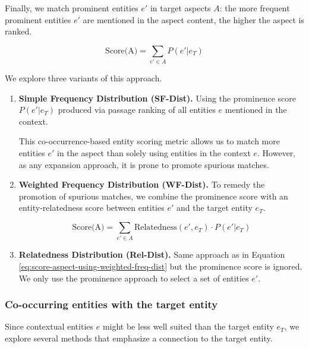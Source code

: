 Finally, we match prominent entities $e'$ in target aspects $A$: the more frequent  prominent entities $e'$ are mentioned in the aspect content, the higher the aspect is ranked. 

    \begin{equation}
    \label{eq:score-aspect-using-simple-freq-dist}
        \text{Score(A)} = \sum_{e' \in A}P(e' \vert e_T)
    \end{equation}



We explore three variants of this approach.

\begin{enumerate}
     \item \textbf{Simple Frequency Distribution (SF-Dist).}
     Using the prominence score $P(e' \vert e_T)$ produced via passage ranking of all entities $e$ mentioned in the context.

This co-occurrence-based entity scoring metric allows us to match more entities $e'$ in the aspect than solely using entities in the context $e$. However, as any expansion approach, it is prone to promote spurious matches. 
 
 \item \textbf{Weighted Frequency Distribution (WF-Dist).} 
 To remedy the promotion of spurious matches, we combine the prominence score with an entity-relatedness score between entities $e'$ and the target entity $e_T$.
 
 \begin{equation}
         \label{eq:score-aspect-using-weighted-freq-dist}
        \text{Score(A)} = \sum_{e' \in A} \text{Relatedness}(e', e_T) \cdot P(e' \vert e_T)
    \end{equation}


\item \textbf{Relatedness Distribution (Rel-Dist).} 
Same approach as in Equation  \ref{eq:score-aspect-using-weighted-freq-dist} but the prominence score is ignored. We only use the prominence approach to select a set of entities $e'$. 

\end{enumerate}

\subsubsection{Co-occurring entities with the target entity} 
\label{subsubsec:Co-occurring entities with the target entity}

Since contextual entities $e$ might be less well suited than the target entity $e_T$, we explore several methods that emphasize a connection to the target entity.



